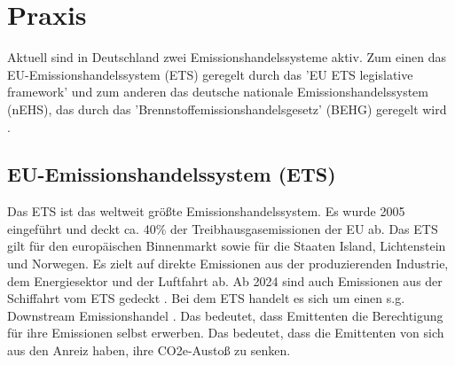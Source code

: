 \chapter{Praxis}

Aktuell sind in Deutschland zwei Emissionshandelssysteme aktiv. Zum einen das EU-Emissionshandelssystem (ETS) geregelt durch das 'EU ETS legislative framework' \cite{eu.2023} und zum anderen das deutsche nationale Emissionshandelssystem (nEHS), das durch das 'Brennstoffemissionshandelsgesetz' (BEHG) geregelt wird \cite{dehst.2023}.

\section{EU-Emissionshandelssystem (ETS)}

Das ETS ist das weltweit größte Emissionshandelssystem. Es wurde 2005 eingeführt und deckt ca. 40\% der Treibhausgasemissionen der EU ab. Das ETS gilt für den europäischen Binnenmarkt sowie für die Staaten Island, Lichtenstein und Norwegen. Es zielt auf direkte Emissionen aus der produzierenden Industrie, dem Energiesektor und der Luftfahrt ab. Ab 2024 sind auch Emissionen aus der Schiffahrt vom ETS gedeckt \cite{eu.2023}.
Bei dem ETS handelt es sich um einen s.g. Downstream Emissionshandel \cite{dehst.2023}. Das bedeutet, dass Emittenten die Berechtigung für ihre Emissionen selbst erwerben. Das bedeutet, dass die Emittenten von sich aus den Anreiz haben, ihre CO2e-Austoß zu senken.  
